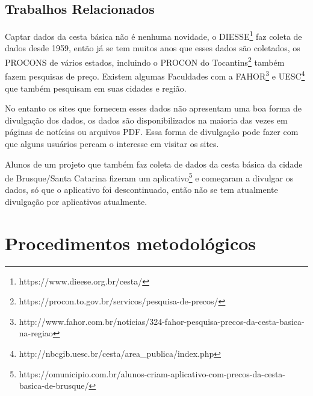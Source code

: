 \documentclass{ifto-tex}
\begin{document}
	\section{Trabalhos Relacionados}
	Captar dados da cesta básica não é nenhuma novidade, o DIESSE\footnote{https://www.dieese.org.br/cesta/} faz coleta de dados desde 1959, então já se tem muitos anos que esses dados são coletados, os PROCONS de vários estados, incluindo o PROCON do Tocantins\footnote{https://procon.to.gov.br/servicos/pesquisa-de-precos/} também fazem pesquisas de preço. Existem algumas Faculdades com a FAHOR\footnote{http://www.fahor.com.br/noticias/324-fahor-pesquisa-precos-da-cesta-basica-na-regiao} e UESC\footnote{http://nbcgib.uesc.br/cesta/area\_publica/index.php} que também pesquisam em suas cidades e região.
	
	No entanto os sites que fornecem esses dados não apresentam uma boa forma de divulgação dos dados, os dados são disponibilizados na maioria das vezes em páginas de notícias  ou arquivos PDF. Essa forma de divulgação pode fazer com que alguns usuários percam o interesse em visitar os sites.
	
	Alunos de um projeto que também faz coleta de dados da cesta básica da cidade de Brusque/Santa Catarina fizeram um aplicativo\footnote{https://omunicipio.com.br/alunos-criam-aplicativo-com-precos-da-cesta-basica-de-brusque/} e começaram a divulgar os dados, só que o aplicativo foi descontinuado, então não se tem atualmente divulgação por aplicativos atualmente.
	
\chapter{Procedimentos metodológicos}
	
\end{document}

